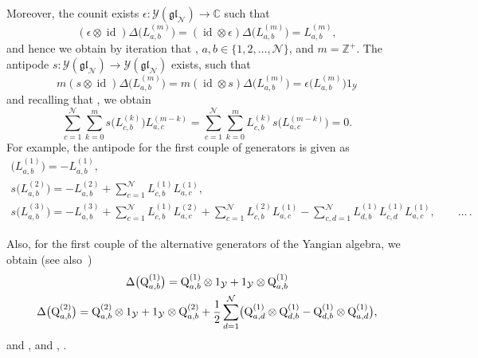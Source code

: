 \documentclass[pdftex]{sigma}
\numberwithin{equation}{section}
\theoremstyle{definition}
\newcommand{\id}{\operatorname{id}}
\begin{document}
Moreover, the counit exists $\epsilon\colon {\mathcal Y}(\mathfrak{gl}_{\mathcal N}) \to {\mathbb C}$ such that
\[
(\epsilon \otimes \id)\Delta\bigl(L_{a,b}^{(m)}\bigr) = (\id \otimes \epsilon)\Delta\bigl(L^{(m)}_{a,b}\bigr) = L_{a,b}^{(m)},
\]
and hence we obtain by iteration that , $a,b \in \{1,2,\dots, {\mathcal N}\}$, and $m= {\mathbb Z}^+$.
The antipode $s\colon {\mathcal Y}(\mathfrak{gl}_{\mathcal N})\to {\mathcal Y}(\mathfrak{gl}_{\mathcal N})$ exists, such that
\[
m(s\otimes \id)\Delta\bigl(L_{a,b}^{(m)}\bigr) =m(\id \otimes s)\Delta\bigl(L_{a,b}^{(m)}\bigr)=\epsilon\bigl(L^{(m)}_{a,b}\bigr)1_{\mathcal Y}
\]
and recalling that , we obtain
\begin{equation*}
\sum_{c=1}^{\mathcal N}\sum_{k=0}^{m} s\bigl(L^{(k)}_{c,b}\bigr) L^{(m-k)}_{a,c} =\sum_{c=1}^{\mathcal N}\sum_{k=0}^{m} L^{(k)}_{c,b} s\bigl(L^{(m-k)}_{a,c}\bigr) =0.
\end{equation*}
For example, the antipode for the first couple of generators is given as
\begin{gather*}
 \bigl(L^{(1)}_{a,b}\bigr) = - L_{a,b}^{(1)}, \nonumber\\
 s\bigl(L^{(2)}_{a,b}\bigr) =
 -L^{(2)}_{a,b} +\sum_{c=1}^{\mathcal N}L^{(1)}_{c,b}L^{(1)}_{a,c},\nonumber\\
 s\bigl(L^{(3)}_{a,b}\bigr) =
 -L^{(3)}_{a,b} +\sum_{c=1}^{\mathcal N}L^{(1)}_{c,b}L^{(2)}_{a,c} + \sum_{c=1}^{\mathcal N}L^{(2)}_{c,b}L^{(1)}_{a,c} -\sum_{c,d=1}^{\mathcal N} L^{(1)}_{d,b}L^{(1)}_{c,d}L^{(1)}_{a,c}, \qquad \dots\,. \end{gather*}


Also, for the first couple of the alternative generators of the Yangian algebra, we obtain (see also~\cite{Chari})
\begin{gather*}
\Delta\bigl({\mathrm Q}_{a,b}^{(1)}\bigr) = {\mathrm Q}_{a,b}^{(1)} \otimes 1_{\mathcal Y} + 1_{\mathcal Y}\otimes
{\mathrm Q}_{a,b}^{(1)} \cr
\Delta\bigl({\mathrm Q}_{a,b}^{(2)}\bigr) = {\mathrm Q}_{a,b}^{(2)}
\otimes 1_{\mathcal Y}+ 1_{\mathcal Y}\otimes {\mathrm Q}_{a,b}^{(2)} + \frac{1}{2}
\sum _{d=1}^{\mathcal N}\bigl({\mathrm Q}_{a,d}^{(1)}\otimes
{\mathrm Q}_{d,b}^{(1)}-
{\mathrm Q}_{d,b}^{(1)}\otimes {\mathrm Q}_{a,d}^{(1)}\bigr), %
\end{gather*}
and , and
, .
\end{document}
